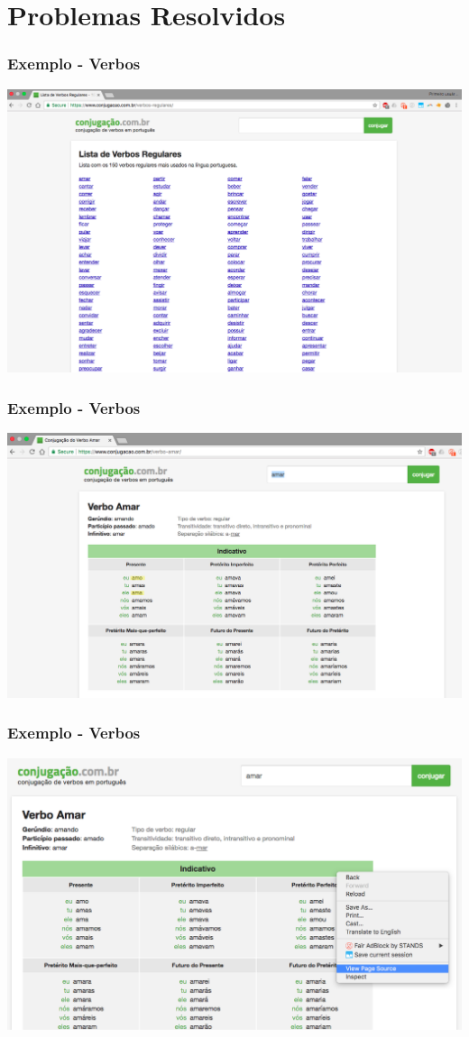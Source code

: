 \documentclass{beamer}
\begin{document}
\section{Problemas Resolvidos}
\begin{frame}
\frametitle{Exemplo - Verbos}
\includegraphics[width=\textwidth]{Screen_Shot_2017-10-05_at_21_21_15.png}
\end{frame}
\begin{frame}
\frametitle{Exemplo - Verbos}
\includegraphics[width=\textwidth]{Screen_Shot_2017-10-05_at_21_26_26.jpg}
\end{frame}

\begin{frame}
\frametitle{Exemplo - Verbos}
\includegraphics[width=\textwidth]{Screen_Shot_2017-10-05_at_22_12_00.png}
\end{frame}
\end{document}
